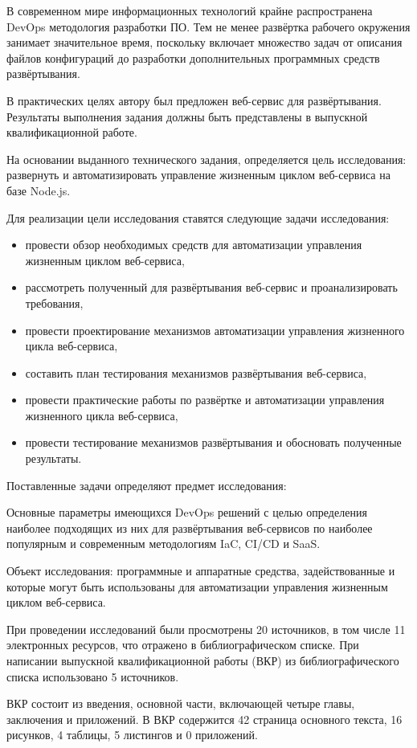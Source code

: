 \Introduction

В современном мире информационных технологий крайне распространена DevOps методология разработки ПО\cite{projectPhoenix}.
Тем не менее развёртка рабочего окружения занимает значительное время, поскольку включает множество задач от
описания файлов конфигураций до разработки дополнительных программных средств развёртывания.

В практических целях автору был предложен веб-сервис для развёртывания.
Результаты выполнения задания должны быть представлены в выпускной квалификационной работе.

На основании выданного технического задания, определяется цель исследования: развернуть и автоматизировать управление жизненным циклом веб-сервиса на базе Node.js.

Для реализации цели исследования ставятся следующие задачи исследования:

\begin{itemize}
    \item провести обзор необходимых средств для автоматизации управления жизненным циклом веб-сервиса,
    \item рассмотреть полученный для развёртывания веб-сервис и проанализировать требования,
    \item провести проектирование механизмов автоматизации управления жизненного цикла веб-сервиса,
    \item составить план тестирования механизмов развёртывания веб-сервиса,
    \item провести практические работы по развёртке и автоматизации управления жизненного цикла веб-сервиса,
    \item провести тестирование механизмов развёртывания и обосновать полученные результаты.
\end{itemize}

Поставленные задачи определяют предмет исследования:

Основные параметры имеющихся DevOps решений с целью определения наиболее подходящих из них для развёртывания веб-сервисов
по наиболее популярным и современным методологиям IaC, CI/CD и SaaS.

Объект исследования: программные и аппаратные средства, задействованные и которые могут быть использованы для автоматизации управления жизненным циклом веб-сервиса.

При проведении исследований были просмотрены 20 источников, в том числе 11 электронных ресурсов, что отражено в библиографическом списке.
При написании выпускной квалификационной работы (ВКР) из библиографического списка использовано 5 источников.

ВКР состоит из введения, основной части, включающей четыре главы, заключения и приложений.
В ВКР содержится 42 страница основного текста, 16 рисунков, 4 таблицы, 5 листингов и 0 приложений\cite{vkrsen}.

